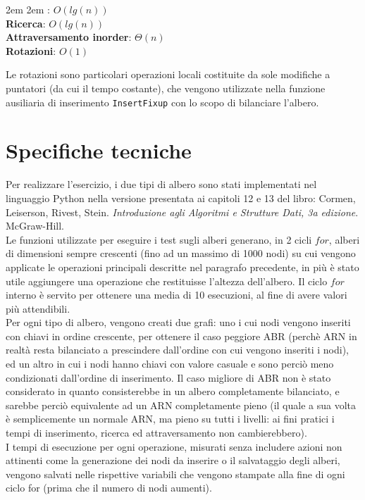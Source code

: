 \documentclass[]{article}
\def\code#1{\texttt{#1}} %
\begin{document}
\begingroup
\leftskip2em \rightskip2em
: $O(lg(n))$\\
{\bf Ricerca}: $O(lg(n))$\\
{\bf Attraversamento inorder}: $\Theta(n)$\\
{\bf Rotazioni}: $O(1)$
\par
\endgroup

\vspace{0.20in}

\noindent Le rotazioni sono particolari operazioni locali costituite da sole modifiche a puntatori (da cui il tempo costante), che vengono utilizzate nella funzione ausiliaria di inserimento \code{InsertFixup} con lo scopo di bilanciare l'albero.


\section {Specifiche tecniche}
Per realizzare l'esercizio, i due tipi di albero sono stati implementati nel linguaggio Python nella versione presentata ai capitoli 12 e 13 del libro: Cormen, Leiserson, Rivest, Stein. \textit{Introduzione agli Algoritmi e Strutture Dati, 3a edizione}. McGraw-Hill. \\
Le funzioni utilizzate per eseguire i test sugli alberi generano, in 2 cicli $for$, alberi di dimensioni sempre crescenti (fino ad un massimo di 1000 nodi) su cui vengono applicate le operazioni principali descritte nel paragrafo precedente, in più è stato utile aggiungere una operazione che restituisse l'altezza dell'albero. Il ciclo $for$ interno è servito per ottenere una media di 10 esecuzioni, al fine di avere valori più attendibili. \\
Per ogni tipo di albero, vengono creati due grafi: uno i cui nodi vengono inseriti con chiavi in ordine crescente, per ottenere il caso peggiore ABR (perchè ARN in realtà resta bilanciato a prescindere dall'ordine con cui vengono inseriti i nodi), ed un altro in cui i nodi hanno chiavi con valore casuale e sono perciò meno condizionati dall'ordine di inserimento. Il caso migliore di ABR non è stato considerato in quanto consisterebbe in un albero completamente bilanciato, e sarebbe perciò equivalente ad un ARN completamente pieno (il quale a sua volta è semplicemente un normale ARN, ma pieno su tutti i livelli: ai fini pratici i tempi di inserimento, ricerca ed attraversamento non cambierebbero). \\
I tempi di esecuzione per ogni operazione, misurati senza includere azioni non attinenti come la generazione dei nodi da inserire o il salvataggio degli alberi, vengono salvati nelle rispettive variabili che vengono stampate alla fine di ogni ciclo for (prima che il numero di nodi aumenti). \\
\end{document}
